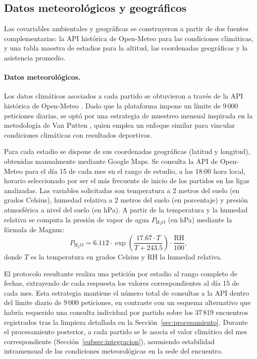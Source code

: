 \subsection{Datos meteorol\'ogicos y geogr\'aficos}
\label{subsec:openmeteo}
\label{subsec:estadios}

Las covariables ambientales y geogr\'aficas se construyeron a partir de dos fuentes complementarias: la API hist\'orica de Open-Meteo \cite{OpenMeteo} para las condiciones clim\'aticas, y una tabla maestra de estadios para la altitud, las coordenadas geogr\'aficas y la asistencia promedio.

\paragraph{Datos meteorol\'ogicos.} Los datos clim\'aticos asociados a cada partido se obtuvieron a trav\'es de la API hist\'orica de Open-Meteo \cite{OpenMeteo}. Dado que la plataforma impone un l\'imite de 9\,000 peticiones diarias, se opt\'o por una estrategia de muestreo mensual inspirada en la metodolog\'ia de Van Putten \cite{VanPutten2023}, quien emplea un enfoque similar para vincular condiciones clim\'aticas con resultados deportivos.

Para cada estadio se dispone de sus coordenadas geogr\'aficas (latitud y longitud), obtenidas manualmente mediante Google Maps. Se consulta la API de Open-Meteo para el d\'ia 15 de cada mes en el rango de estudio, a las 18:00 hora local, horario seleccionado por ser el m\'as frecuente de inicio de los partidos en las ligas analizadas. Las variables solicitadas son temperatura a 2 metros del suelo (en grados Celsius), humedad relativa a 2 metros del suelo (en porcentaje) y presi\'on atmosf\'erica a nivel del suelo (en hPa). A partir de la temperatura y la humedad relativa se computa la presi\'on de vapor de agua $P_{\mathrm{H_2O}}$ (en hPa) mediante la f\'ormula de Magnus:
\begin{equation}
	P_{\mathrm{H_2O}} = 6{.}112 \cdot 
	\exp\!\left(\frac{17{.}67 \cdot T}{T + 243{.}5}\right) \cdot 
	\frac{\mathrm{RH}}{100},
	\label{eq:magnus}
\end{equation}
donde $T$ es la temperatura en grados Celsius y $\mathrm{RH}$ la humedad relativa.

El protocolo resultante realiza una petici\'on por estadio al rango completo de fechas, extrayendo de cada respuesta los valores correspondientes al d\'ia 15 de cada mes. Esta estrategia mantiene el n\'umero total de consultas a la API dentro del l\'imite diario de 9\,000 peticiones, en contraste con un esquema alternativo que habr\'ia requerido una consulta individual por partido sobre los 37\,819 encuentros registrados tras la limpieza detallada en la Secci\'on~\ref{sec:procesamiento}. Durante el procesamiento posterior, a cada partido se le asocia el valor clim\'atico del mes correspondiente (Secci\'on~\ref{subsec:integracion}), asumiendo estabilidad intramensual de las condiciones meteorol\'ogicas en la sede del encuentro.

